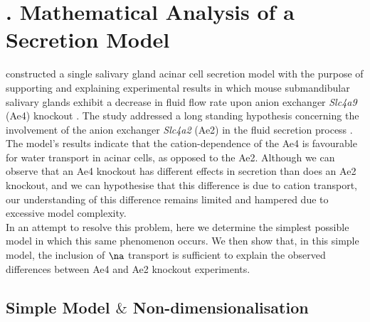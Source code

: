 \section{. Mathematical Analysis of a Secretion Model}
\label{appendix:Analysis}

\cite{siguenza2017Ae4} constructed a single salivary gland acinar cell secretion model with the purpose of supporting and explaining experimental results in which mouse submandibular salivary glands exhibit a decrease in fluid flow rate upon anion exchanger \textit{Slc4a9} (Ae4) knockout \citep{pena2015ae4}. The study addressed a long standing hypothesis concerning the involvement of the anion exchanger \textit{Slc4a2} (Ae2) in the fluid secretion process \citep{evans2000severe}. The model's results indicate that the cation-dependence of the Ae4 is favourable for water transport in acinar cells, as opposed to the Ae2. Although we can observe that an Ae4 knockout has different effects in secretion than does an Ae2 knockout, and we can hypothesise that this difference is due to cation transport, our understanding of this difference remains limited and hampered due to excessive model complexity.\\

In an attempt to resolve this problem, here we determine the simplest possible model in which this same phenomenon occurs. We then show that, in this simple model, the inclusion of $\na$ transport is sufficient to explain the observed differences between Ae4 and Ae2 knockout experiments.

\subsection{Simple Model $\&$ Non-dimensionalisation}

